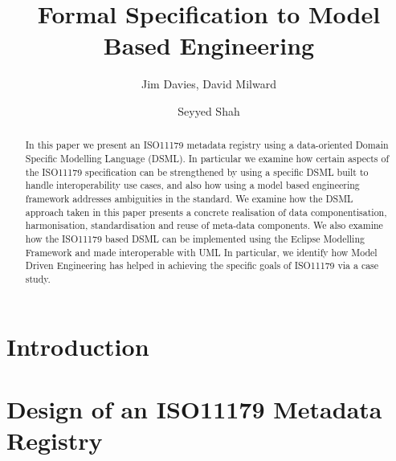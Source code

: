 \documentclass{llncs}
\begin{document}
\title{Formal Specification to Model Based Engineering}

\author{Jim Davies, David Milward \and Seyyed Shah}
\maketitle

\begin{abstract}
In this paper we present an ISO11179 metadata registry using a data-oriented Domain Specific Modelling Language (DSML). In particular we examine how certain aspects of the ISO11179 specification can be strengthened by using a specific DSML built to handle interoperability use cases, and also how using a model based engineering framework addresses ambiguities in the standard. We examine how the DSML approach taken in this paper presents a concrete realisation of data componentisation, harmonisation, standardisation and reuse of meta-data components. We also examine how the ISO11179 based DSML can be implemented using the Eclipse Modelling Framework and made interoperable with UML In particular, we identify how Model Driven Engineering has helped in achieving the specific goals of ISO11179 via a case study.

\end{abstract}


\noindent

\section{Introduction}

\section{Design of an ISO11179 Metadata Registry}
\end{document}
